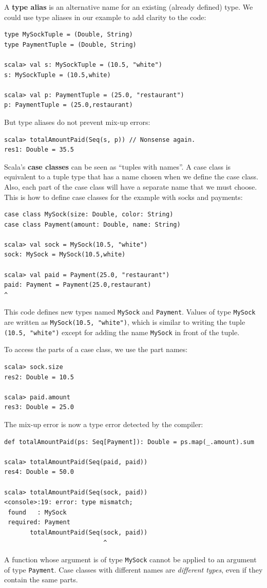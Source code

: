 A \textbf{type alias} is an alternative name for
an existing (already defined) type. We could use type aliases in our
example to add clarity to the code:
\begin{lstlisting}
type MySockTuple = (Double, String)
type PaymentTuple = (Double, String)

scala> val s: MySockTuple = (10.5, "white")
s: MySockTuple = (10.5,white)

scala> val p: PaymentTuple = (25.0, "restaurant")
p: PaymentTuple = (25.0,restaurant)
\end{lstlisting}
But type aliases do not prevent mix-up errors:
\begin{lstlisting}
scala> totalAmountPaid(Seq(s, p)) // Nonsense again.
res1: Double = 35.5
\end{lstlisting}

Scala\textsf{'}s \textbf{case classes} can be seen as \textsf{``}tuples
with names\textsf{''}. A case class is equivalent to a tuple type that has
a name chosen when we define the case class. Also, each part of the
case class will have a separate name that we must choose. This is
how to define case classes for the example with socks and payments:
\begin{lstlisting}
case class MySock(size: Double, color: String)
case class Payment(amount: Double, name: String)

scala> val sock = MySock(10.5, "white")
sock: MySock = MySock(10.5,white)

scala> val paid = Payment(25.0, "restaurant")
paid: Payment = Payment(25.0,restaurant)                                  ^ 
\end{lstlisting}
This code defines new types named \lstinline!MySock! and \lstinline!Payment!.
Values of type \lstinline!MySock! are written as \lstinline!MySock(10.5, "white")!,
which is similar to writing the tuple \lstinline!(10.5, "white")!
except for adding the name \lstinline!MySock! in front of the tuple.

To access the parts of a case class, we use the part names:
\begin{lstlisting}
scala> sock.size
res2: Double = 10.5

scala> paid.amount
res3: Double = 25.0
\end{lstlisting}
The mix-up error is now a type error detected by
the compiler:
\begin{lstlisting}
def totalAmountPaid(ps: Seq[Payment]): Double = ps.map(_.amount).sum

scala> totalAmountPaid(Seq(paid, paid))
res4: Double = 50.0

scala> totalAmountPaid(Seq(sock, paid))
<console>:19: error: type mismatch;
 found   : MySock
 required: Payment
       totalAmountPaid(Seq(sock, paid))
                           ^
\end{lstlisting}
A function whose argument is of type \lstinline!MySock! cannot be
applied to an argument of type \lstinline!Payment!. Case classes
with different names are \emph{different types}, even if they contain
the same parts. 

